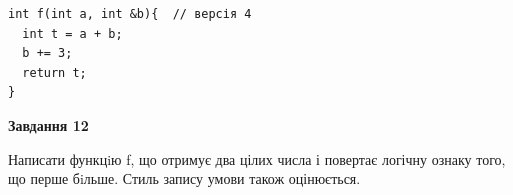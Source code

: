\documentclass[12pt, ukrainian]{article}
\begin{document}
{\begin {large}
\begin{minipage}[t]{11.0cm}
\vspace{-8mm}\begin{verbatim}
int f(int a, int &b){  // версія 4
  int t = a + b;
  b += 3;
  return t;
}
\end{verbatim}



\begin{center}
\textbf{Завдання 12}
\end{center}

Написати функцiю f, що отримує два цілих числа і повертає логічну ознаку того, що перше бiльше. Стиль запису умови також оцінюється.\par

\end{minipage}

\end {large}}
\newpage
\end{document}
